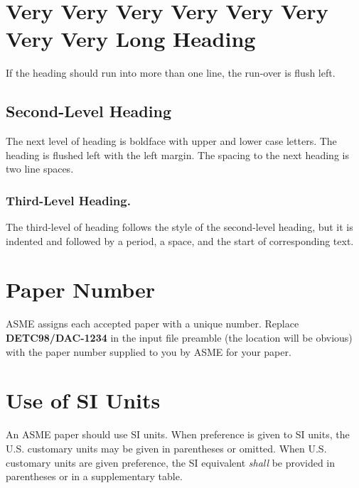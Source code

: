 \documentclass[twocolumn,10pt]{asme2e}
\begin{document}
\section*{Very Very Very Very Very Very Very Very Long Heading}

If the heading should run into more than one line, the run-over is flush left.

\subsection*{Second-Level Heading}

The next level of heading is boldface with upper and lower case letters.
The heading is flushed left with the left margin.
The spacing to the next heading is two line spaces.

\subsubsection*{Third-Level Heading.}

The third-level of heading follows the style of the second-level heading, but it is indented and followed by a period, a space, and the start of corresponding text.

\section*{Paper Number}

ASME assigns each accepted paper with a unique number.
Replace {\bf DETC98/DAC-1234} in the input file preamble (the location will be obvious) with the paper number supplied to you by ASME for your paper.


\section*{Use of SI Units}

An ASME paper should use SI units.
When preference is given to SI units, the U.S. customary units may be given in parentheses or omitted.
When U.S. customary units are given preference, the SI equivalent {\em shall} be provided in parentheses or in a supplementary table.
\end{document}
